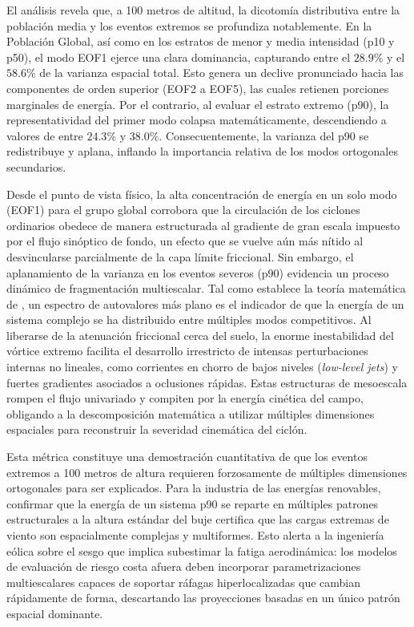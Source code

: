 El análisis revela que, a 100 metros de altitud, la dicotomía distributiva entre la población media y los eventos extremos se profundiza notablemente. En la Población Global, así como en los estratos de menor y media intensidad (p10 y p50), el modo EOF1 ejerce una clara dominancia, capturando entre el $28.9\%$ y el $58.6\%$ de la varianza espacial total. Esto genera un declive pronunciado hacia las componentes de orden superior (EOF2 a EOF5), las cuales retienen porciones marginales de energía. Por el contrario, al evaluar el estrato extremo (p90), la representatividad del primer modo colapsa matemáticamente, descendiendo a valores de entre $24.3\%$ y $38.0\%$. Consecuentemente, la varianza del p90 se redistribuye y aplana, inflando la importancia relativa de los modos ortogonales secundarios.

Desde el punto de vista físico, la alta concentración de energía en un solo modo (EOF1) para el grupo global corrobora que la circulación de los ciclones ordinarios obedece de manera estructurada al gradiente de gran escala impuesto por el flujo sinóptico de fondo, un efecto que se vuelve aún más nítido al desvincularse parcialmente de la capa límite friccional. Sin embargo, el aplanamiento de la varianza en los eventos severos (p90) evidencia un proceso dinámico de fragmentación multiescalar. Tal como establece la teoría matemática de \citet{hannachi2007empirical}, un espectro de autovalores más plano es el indicador de que la energía de un sistema complejo se ha distribuido entre múltiples modos competitivos. Al liberarse de la atenuación friccional cerca del suelo, la enorme inestabilidad del vórtice extremo facilita el desarrollo irrestricto de intensas perturbaciones internas no lineales, como corrientes en chorro de bajos niveles (\textit{low-level jets}) y fuertes gradientes asociados a oclusiones rápidas. Estas estructuras de mesoescala rompen el flujo univariado y compiten por la energía cinética del campo, obligando a la descomposición matemática a utilizar múltiples dimensiones espaciales para reconstruir la severidad cinemática del ciclón.

Esta métrica constituye una demostración cuantitativa de que los eventos extremos a 100 metros de altura requieren forzosamente de múltiples dimensiones ortogonales para ser explicados. Para la industria de las energías renovables, confirmar que la energía de un sistema p90 se reparte en múltiples patrones estructurales a la altura estándar del buje certifica que las cargas extremas de viento son espacialmente complejas y multiformes. Esto alerta a la ingeniería eólica sobre el sesgo que implica subestimar la fatiga aerodinámica: los modelos de evaluación de riesgo costa afuera deben incorporar parametrizaciones multiescalares capaces de soportar ráfagas hiperlocalizadas que cambian rápidamente de forma, descartando las proyecciones basadas en un único patrón espacial dominante.
